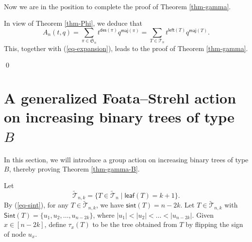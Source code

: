 \documentclass[12pt]{article}
\numberwithin{equation}{section}
\theoremstyle{plain}
\def\des{\mathsf{des}}
\def\maj{\mathsf{maj}}
\def\sint{\mathsf{sint}}
\def\l{\mathsf{left}}
\def\Sint{\mathsf{Sint}}
\def\l{\mathsf{left}}
\def\B{\mathcal{T}}
\def\leaf{\mathsf{leaf}}
\begin{document}
	 				Now we are in the position to complete the proof of Theorem \ref{thm-gamma}.
	 				
	 			 
	 				In view of Theorem \ref{thm-Phi}, we deduce that
	 				$$
	 				A_n(t,q)=	\sum\limits_{\pi\in \mathfrak{S}_n}t^{\des(\pi)}q^{\maj(\pi)}=	\sum\limits_{T\in \B_n}t^{\l(T)}q^{\maj(T)}.
	 				$$
	 				This,  together with (\ref{eq-expansion}),  leads to the proof of Theorem \ref{thm-gamma}. 
	 				
	 				\qed
	 			
	 				 \section{A generalized Foata–Strehl action on  increasing binary trees of type $B$}
	 				 In this section, we will introduce a group action on increasing binary trees of type $B$, thereby proving Theorem  \ref{thm-gamma-B}. 
	 				 
	 				 
	 				 
	 				 Let $$ \widetilde{\B}_{n,k}=\{T\in \widetilde{\B}_{n}\mid  \leaf(T)=k+1\}.$$
	 				 By (\ref{eq-sint}),   for any $T\in \widetilde{\B}_{n,k}$,  we have $\sint(T)=n-2k$.
	 				 Let  $T\in \widetilde{\B}_{n,k}$ with $\Sint(T)=\{u_1, u_2, \ldots, u_{n-2k}\}$, where $|u_1|<|u_2|<\ldots< |u_{n-2k}|$.  Given $x\in[n-2k]$,    
	 			define  $\tau_x(T)$ to  be the tree obtained from $T$ by  flipping the sign of node $u_x$.
	 				
\end{document}

